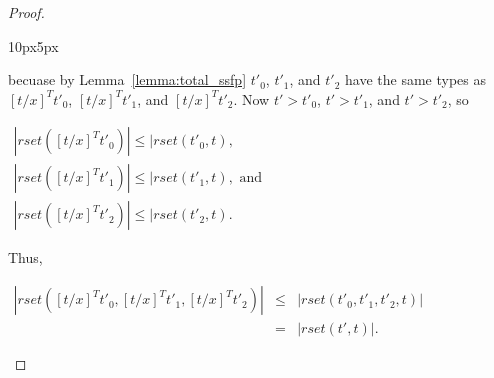 \begin{proof}
\begin{changemargin}{10px}{5px}
\begin{itemize}
\begin{center}
  \end{center}
  becuase by Lemma~\ref{lemma:total_ssfp} $t'_0$, $t'_1$, and $t'_2$ have the same types as $[t/x]^T t'_0$, $[t/x]^T t'_1$, and $[t/x]^T t'_2$.
  Now $t' > t'_0$, $t' > t'_1$, and $t' > t'_2$, so 
  \begin{center}
    \begin{math}
      \begin{array}{lll}
        |rset([t/x]^T t'_0)| \leq |rset(t'_0, t),\\
        |rset([t/x]^T t'_1)| \leq |rset(t'_1, t), \text{ and }\\
        |rset([t/x]^T t'_2)| \leq |rset(t'_2, t).
      \end{array}
    \end{math}
  \end{center}
  Thus, 
  \begin{center}
    \begin{math}
      \begin{array}{lll}
        |rset([t/x]^T t'_0, [t/x]^T t'_1, [t/x]^T t'_2)| & \leq & |rset(t'_0,t'_1,t'_2,t)|\\
        & =    & |rset(t',t)|.
      \end{array}
    \end{math}
  \end{center}
    

\end{itemize}
\end{changemargin}
\end{proof}
